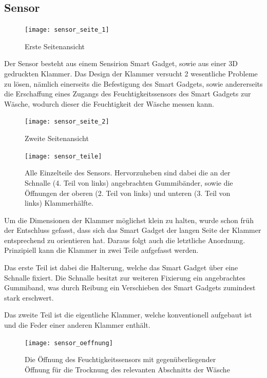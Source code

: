 \newpage
\subsection{Sensor}

\begin{figure}[H] 
	\centerline{\texttt{[image: sensor\_seite\_1]}}
	\caption{Erste Seitenansicht}
	\label{sensor_seite_1}
\end{figure}

Der Sensor besteht aus einem Sensirion Smart Gadget, sowie aus einer 3D gedruckten Klammer. Das Design der Klammer versucht 2 wesentliche Probleme zu lösen, nämlich einerseits die Befestigung des Smart Gadgets, sowie andererseits die Erschaffung eines Zugangs des Feuchtigkeitssensors des Smart Gadgets zur Wäsche, wodurch dieser die Feuchtigkeit der Wäsche messen kann.

\newpage
\begin{figure}[H] 
	\centerline{\texttt{[image: sensor\_seite\_2]}}
	\caption{Zweite Seitenansicht}
	\label{sensor_seite_2}
\end{figure}

\begin{figure}[H] 
	\centerline{\texttt{[image: sensor\_teile]}}
	\caption{Alle Einzelteile des Sensors. Hervorzuheben sind dabei die an der Schnalle (4. Teil von links) angebrachten Gummibänder, sowie die Öffnungen der oberen (2. Teil von links) und unteren (3. Teil von links) Klammerhälfte.}
	\label{sensor_teile}
\end{figure}

Um die Dimensionen der Klammer möglichst klein zu halten, wurde schon früh der Entschluss gefasst, dass sich das Smart Gadget der langen Seite der Klammer entsprechend zu orientieren hat. Daraus folgt auch die letztliche Anordnung. Prinzipiell kann die Klammer in zwei Teile aufgefasst werden.

Das erste Teil ist dabei die Halterung, welche das Smart Gadget über eine Schnalle fixiert. Die Schnalle besitzt zur weiteren Fixierung ein angebrachtes Gummiband, was durch Reibung ein Verschieben des Smart Gadgets zumindest stark erschwert.

Das zweite Teil ist die eigentliche Klammer, welche konventionell aufgebaut ist und die Feder einer anderen Klammer enthält.

\begin{figure}[H] 
	\centerline{\texttt{[image: sensor\_oeffnung]}}
	\caption{Die Öffnung des Feuchtigkeitssensors mit gegenüberliegender Öffnung für die Trocknung des relevanten Abschnitts der Wäsche}
	\label{sensor_oeffnung}
\end{figure}

